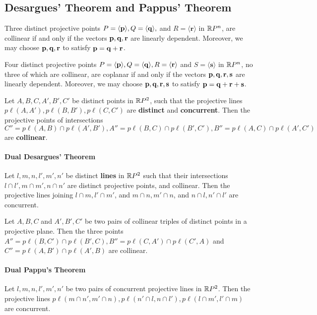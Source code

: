 \subsection{Desargues' Theorem and Pappus' Theorem}

\begin{proposition}
    \begin{statements}{}
        \item Three distinct projective points \(P = \langle \mathbf{p} \rangle, Q = \langle \mathbf{q} \rangle,\) and \(R = \langle \mathbf{r} \rangle\) in \(\mathbb{R} P^n\), are collinear if and only if the vectors \(\mathbf{p}, \mathbf{q}, \mathbf{r}\) are linearly dependent. Moreover, we may choose \(\mathbf{p}, \mathbf{q}, \mathbf{r}\) to satisfy \(\mathbf{p} = \mathbf{q} + \mathbf{r}\).
        \item Four distinct projective points \(P = \langle \mathbf{p} \rangle, Q  = \langle \mathbf{q} \rangle, R = \langle \mathbf{r} \rangle\) and \(S = \langle \mathbf{s} \rangle\) in \(\mathbb{R} P^n\), no three of which are collinear, are coplanar if and only if the vectors \(\mathbf{p}, \mathbf{q}, \mathbf{r}, \mathbf{s}\) are linearly dependent. Moreover, we may choose \(\mathbf{p}, \mathbf{q}, \mathbf{r}, \mathbf{s}\) to satisfy \(\mathbf{p} = \mathbf{q} + \mathbf{r} + \mathbf{s}\).
    \end{statements}
\end{proposition}


\begin{theorem}
    Let \(A, B, C, A', B', C'\) be distinct points in \(\mathbb{R} P^2\), such that the projective lines \(p\ell(A, A'), p\ell(B, B'), p\ell(C, C')\) are \textbf{distinct} and \textbf{concurrent}. Then the projective points of intersections \(C'' = p\ell(A, B) \cap p\ell(A', B'), A'' = p\ell(B, C) \cap p\ell(B', C'), B'' = p\ell(A, C) \cap p\ell(A', C')\) are \textbf{collinear}.
\end{theorem}

\paragraph{Dual Desargues' Theorem}
Let \(l, m, n, l', m', n'\) be distinct \textbf{lines} in \(\mathbb{R} P^2\) such that their intersections \(l \cap l', m \cap m', n \cap n'\) are distinct projective points, and collinear. Then the projective lines joining \(l \cap m, l' \cap m'\), and \(m \cap n, m' \cap n\), and \(n \cap l, n' \cap l'\) are concurrent.

\begin{theorem}
    Let \(A, B, C\) and \(A', B', C'\) be two pairs of collinear triples of distinct points in a projective plane. Then the three points \(A'' = p\ell(B, C') \cap p\ell(B', C), B'' = p\ell(C, A') \cap p\ell(C', A)\) and \(C'' = p\ell(A, B') \cap p\ell(A' ,B)\) are collinear.
\end{theorem}

\paragraph{Dual Pappu's Theorem}
Let \(l, m, n, l', m', n'\) be two pairs of concurrent projective lines in \(\mathbb{R} P^2\). Then the projective lines \(p\ell(m \cap n', m' \cap n), p\ell(n' \cap l, n \cap l'), p\ell(l \cap m', l' \cap m)\) are concurrent.